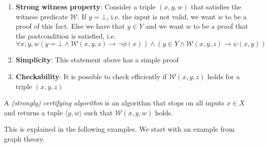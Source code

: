 \begin{enumerate}
    \item \textbf{Strong witness property}: Consider a triple $(x,y,w)$ that satisfies the witness predicate $\mathcal{W}$. If $y=\bot$, i.e. the input is not valid, we want $w$ to be a proof of this fact. Else we have that $y\in Y$ and we want $w$ to be a proof that the postcondition is satisfied, i.e.
    \[ \forall x,y,w (y = \bot \land \mathcal{W}(x,y,z) \rightarrow \neg \phi(x)) \land (y \in Y \land \mathcal{W}(x,y,z) \rightarrow \psi(x,y)) \]
    \item \textbf{Simplicity}: This statement above has a simple proof
    \item \textbf{Checkability}: It is possible to check efficiently if $\mathcal{W}(x,y,z)$ holds for a triple $(x,y,z)$
\end{enumerate}

A \textit{(strongly) certifying algorithm} is an algorithm that stops on all inputs $x \in X$ and returns a tuple $\langle y, w\rangle$ such that $\mathcal{W}(x,y,w)$ holds.

This is explained in the following examples. We start with an example from graph theory.

